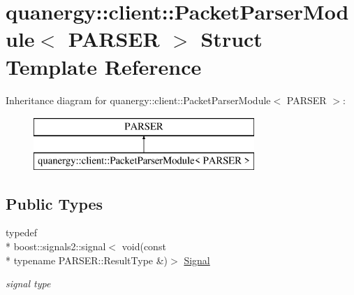 \hypertarget{structquanergy_1_1client_1_1PacketParserModule}{\section{quanergy\-:\-:client\-:\-:Packet\-Parser\-Module$<$ P\-A\-R\-S\-E\-R $>$ Struct Template Reference}
\label{structquanergy_1_1client_1_1PacketParserModule}
}
Inheritance diagram for quanergy\-:\-:client\-:\-:Packet\-Parser\-Module$<$ P\-A\-R\-S\-E\-R $>$\-:\begin{figure}[H]
\begin{center}
\leavevmode
\includegraphics[height=2.000000cm]{structquanergy_1_1client_1_1PacketParserModule}
\end{center}
\end{figure}
\subsection*{Public Types}
\begin{DoxyCompactItemize}
\item 
\hypertarget{structquanergy_1_1client_1_1PacketParserModule_a27105b55007e3ff6713d7775dbac2b6e}{typedef \\*
boost\-::signals2\-::signal$<$ void(const \\*
typename P\-A\-R\-S\-E\-R\-::\-Result\-Type \&)$>$ \hyperlink{structquanergy_1_1client_1_1PacketParserModule_a27105b55007e3ff6713d7775dbac2b6e}{Signal}}\label{structquanergy_1_1client_1_1PacketParserModule_a27105b55007e3ff6713d7775dbac2b6e}

\begin{DoxyCompactList}\small\item\em signal type \end{DoxyCompactList}\end{DoxyCompactItemize}
